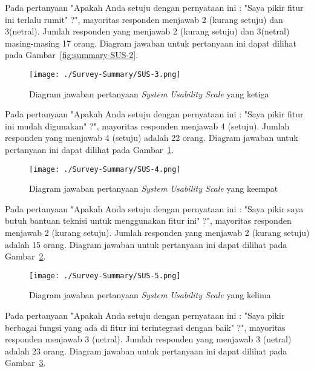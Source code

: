 Pada pertanyaan "Apakah Anda setuju dengan pernyataan ini : "Saya pikir fitur ini terlalu rumit" ?", mayoritas responden menjawab 2 (kurang setuju) dan 3(netral). Jumlah responden yang menjawab 2 (kurang setuju) dan 3(netral) masing-masing 17 orang. Diagram jawaban untuk pertanyaan ini dapat dilihat pada Gambar~\ref{fig:summary-SUS-2}.

\begin{figure}[H]
	\centering  
	\texttt{[image: ./Survey-Summary/SUS-3.png]}
	\caption[Diagram jawaban pertanyaan \textit{System Usability Scale} yang ketiga]{Diagram jawaban pertanyaan \textit{System Usability Scale} yang ketiga} 
	\label{fig:summary-SUS-3} 
\end{figure}

Pada pertanyaan "Apakah Anda setuju dengan pernyataan ini : "Saya pikir fitur ini mudah digunakan" ?", mayoritas responden menjawab 4 (setuju). Jumlah responden yang menjawab 4 (setuju) adalah 22 orang. Diagram jawaban untuk pertanyaan ini dapat dilihat pada Gambar~\ref{fig:summary-SUS-3}.

\begin{figure}[H]
	\centering  
	\texttt{[image: ./Survey-Summary/SUS-4.png]}
	\caption[Diagram jawaban pertanyaan \textit{System Usability Scale} yang keempat]{Diagram jawaban pertanyaan \textit{System Usability Scale} yang keempat} 
	\label{fig:summary-SUS-4} 
\end{figure}

Pada pertanyaan "Apakah Anda setuju dengan pernyataan ini : "Saya pikir saya butuh bantuan teknisi untuk menggunakan fitur ini" ?", mayoritas responden menjawab 2 (kurang setuju). Jumlah responden yang menjawab 2 (kurang setuju) adalah 15 orang. Diagram jawaban untuk pertanyaan ini dapat dilihat pada Gambar~\ref{fig:summary-SUS-4}.

\begin{figure}[H]
	\centering  
	\texttt{[image: ./Survey-Summary/SUS-5.png]}
	\caption[Diagram jawaban pertanyaan \textit{System Usability Scale} yang kelima]{Diagram jawaban pertanyaan \textit{System Usability Scale} yang kelima} 
	\label{fig:summary-SUS-5} 
\end{figure}

Pada pertanyaan "Apakah Anda setuju dengan pernyataan ini : "Saya pikir berbagai fungsi yang ada di fitur ini terintegrasi dengan baik" ?", mayoritas responden menjawab 3 (netral). Jumlah responden yang menjawab 3 (netral) adalah 23 orang. Diagram jawaban untuk pertanyaan ini dapat dilihat pada Gambar~\ref{fig:summary-SUS-5}.

